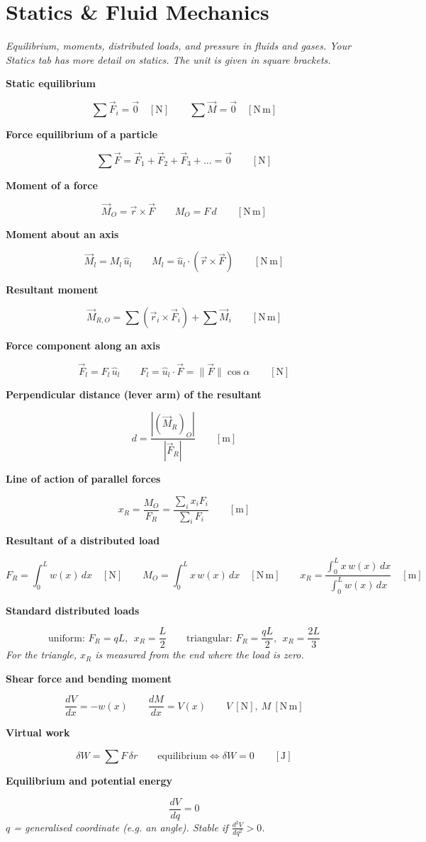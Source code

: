 \documentclass[11pt]{article}
\newcommand{\sect}[2]{\section*{\color{#1}#2}}
\newcommand{\sub}[1]{\par\medskip\textbf{#1}\par}
\newcommand{\expl}[1]{{\color{gray}\itshape #1}\par}
\begin{document}
\sect{cStF}{Statics \& Fluid Mechanics}
\expl{Equilibrium, moments, distributed loads, and pressure in fluids and gases. Your Statics tab has more detail on statics. The unit is given in square brackets.}

\sub{Static equilibrium}
\[ \sum \vec F_i = \vec 0 \quad [\mathrm{N}] \qquad \sum \vec M = \vec 0 \quad [\mathrm{N\,m}] \]

\sub{Force equilibrium of a particle}
\[ \sum \vec F = \vec F_1 + \vec F_2 + \vec F_3 + \dots = \vec 0 \qquad [\mathrm{N}] \]

\sub{Moment of a force}
\[ \vec M_O = \vec r\times\vec F \qquad M_O = F\,d \qquad [\mathrm{N\,m}] \]

\sub{Moment about an axis}
\[ \vec M_l = M_l\,\hat u_l \qquad M_l = \hat u_l\cdot(\vec r\times\vec F) \qquad [\mathrm{N\,m}] \]

\sub{Resultant moment}
\[ \vec M_{R,O} = \sum (\vec r_i\times\vec F_i) + \sum \vec M_i \qquad [\mathrm{N\,m}] \]

\sub{Force component along an axis}
\[ \vec F_l = F_l\,\hat u_l \qquad F_l = \hat u_l\cdot\vec F = \|\vec F\|\cos\alpha \qquad [\mathrm{N}] \]

\sub{Perpendicular distance (lever arm) of the resultant}
\[ d = \frac{\left|\left(\vec M_R\right)_O\right|}{\left|\vec F_R\right|} \qquad [\mathrm{m}] \]

\sub{Line of action of parallel forces}
\[ x_R = \frac{M_O}{F_R} = \frac{\sum_i x_i F_i}{\sum_i F_i} \qquad [\mathrm{m}] \]

\sub{Resultant of a distributed load}
\[ F_R = \int_0^L w(x)\,dx \quad [\mathrm{N}] \qquad M_O = \int_0^L x\,w(x)\,dx \quad [\mathrm{N\,m}] \qquad x_R = \frac{\int_0^L x\,w(x)\,dx}{\int_0^L w(x)\,dx} \quad [\mathrm{m}] \]

\sub{Standard distributed loads}
\[ \text{uniform: } F_R = qL,\ \ x_R = \frac{L}{2} \qquad \text{triangular: } F_R = \frac{qL}{2},\ \ x_R = \frac{2L}{3} \]
\expl{For the triangle, $x_R$ is measured from the end where the load is zero.}

\sub{Shear force and bending moment}
\[ \frac{dV}{dx} = -w(x) \qquad \frac{dM}{dx} = V(x) \qquad V\ [\mathrm{N}],\ M\ [\mathrm{N\,m}] \]

\sub{Virtual work}
\[ \delta W = \sum F\,\delta r \qquad \text{equilibrium} \iff \delta W = 0 \qquad [\mathrm{J}] \]

\sub{Equilibrium and potential energy}
\[ \frac{dV}{dq} = 0 \]
\expl{$q$ = generalised coordinate (e.g. an angle). Stable if $\frac{d^2V}{dq^2} > 0$.}
\end{document}
